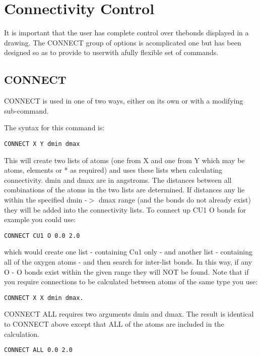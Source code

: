 \documentclass[10pt,a4paper]{report}
\begin{document}
\chapter{Connectivity Control}

It is important that the user has complete control over thebonds displayed in a drawing. The CONNECT group of options is acomplicated one but has been designed so as to provide to userwith afully flexible set of commands.\section{CONNECT}


CONNECT is used in one of two ways, either on its own or with
a
modifying sub-command.


\bigskip{}


The syntax for this command is:
\small\begin{verbatim}
CONNECT X Y dmin dmax
\end{verbatim}\normalsize




This will create two lists of atoms (one from X and one from Y
which may
be atoms, elements or * as required) and uses these lists
when calculating connectivity. dmin and dmax are in angstroms. The
distances between all combinations of the atoms in the two lists
are
determined. If distances any lie within
the specified dmin -$>$ dmax range (and the bonds do not already
exist)
they will be added into the connectivity lists.  To connect up
CU1 O bonds for example you could
use:
\small\begin{verbatim}
CONNECT CU1 O 0.0 2.0
\end{verbatim}\normalsize


which would create one list - containing Cu1 only - and another
list -
containing all of the oxygen atoms - and then search for
inter-list
bonds. In this way, if any O - O bonds exist within the given
range they
will NOT be found. Note that if you require
connections to be calculated between atoms of the same type you
use:
\small\begin{verbatim}CONNECT X X dmin dmax.
\end{verbatim}\normalsize

\bigskip{}
CONNECT ALL requires two arguments dmin and dmax. The result is
identical to CONNECT above except that ALL of the atoms are
included in
the calculation.
\small\begin{verbatim}
CONNECT ALL 0.0 2.0
\end{verbatim}\normalsize
\end{document}
